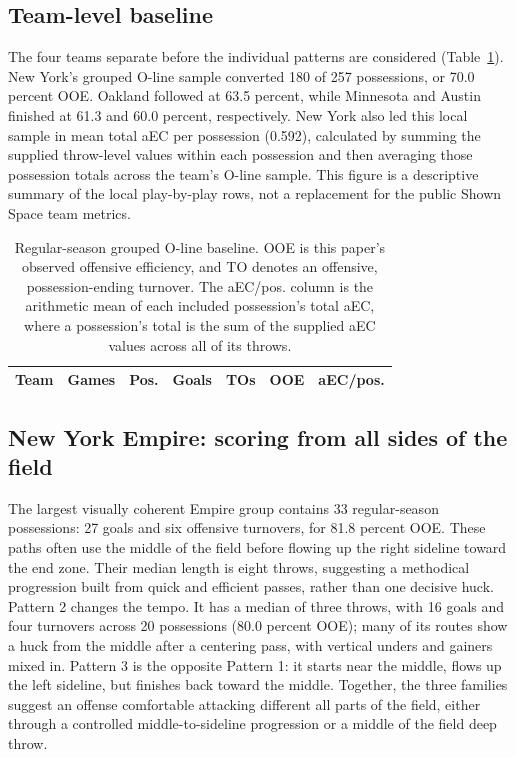 \documentclass[11pt]{article}
\newcommand{\aEC}{aEC}
\newcommand{\Oline}{O-line}
\begin{document}
\subsection{Team-level baseline}

The four teams separate before the individual patterns are considered
(Table~\ref{tab:team-summary}). New York's grouped \Oline{} sample converted 180
of 257 possessions, or 70.0 percent OOE. Oakland followed at 63.5 percent, while
Minnesota and Austin finished at 61.3 and 60.0 percent, respectively. New York
also led this local sample in mean total \aEC{} per possession (0.592), calculated
by summing the supplied throw-level values within each possession and then
averaging those possession totals across the team's \Oline{} sample. This figure
is a descriptive summary of the local play-by-play rows, not a replacement for
the public Shown Space team metrics.

\begin{table}[H]
  \centering
  \caption{Regular-season grouped \Oline{} baseline. OOE is this paper's observed
  offensive efficiency, and TO denotes an offensive, possession-ending turnover.
  The aEC/pos. column is the arithmetic mean of each included possession's total
  \aEC{}, where a possession's total is the sum of the supplied \aEC{} values
  across all of its throws.}
  \label{tab:team-summary}
  \small
  \begin{tabular}{lrrrrrr}
    \toprule
    Team & Games & Pos. & Goals & TOs & OOE & aEC/pos. \\
    \midrule
    
  \end{tabular}
\end{table}

\subsection{New York Empire: scoring from all sides of the field}

The largest visually coherent Empire group contains 33 regular-season
possessions: 27 goals and six offensive turnovers, for 81.8 percent OOE. These
paths often use the middle of the field before flowing up the right sideline
toward the end zone. Their median length is eight throws, suggesting a methodical
progression built from quick and efficient passes, rather than one decisive
huck. Pattern 2 changes the tempo. It has a median of three throws, with 16 goals
and four turnovers across 20 possessions (80.0 percent OOE); many of its routes
show a huck from the middle after a centering pass, with vertical unders and
gainers mixed in. Pattern 3 is the opposite Pattern 1: it starts near the middle, flows
up the left sideline, but finishes back toward the middle. Together, the three
families suggest an offense comfortable attacking different all parts of the field,
either through a controlled middle-to-sideline progression or a middle of the field deep
throw.
\end{document}
